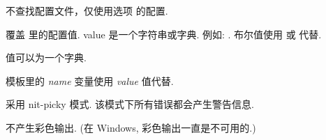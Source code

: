 \documentclass[letterpaper,10pt,english]{sphinxmanual}
\begin{document}

\begin{fulllineitems}
\label{invocation:cmdoption-sphinx-build-C}
不查找配置文件，仅使用选项  的配置.


\end{fulllineitems}


\begin{fulllineitems}
\label{invocation:cmdoption-sphinx-build-D}
覆盖  里的配置值.  value 是一个字符串或字典.
例如: .
布尔值使用  或  代替.

值可以为一个字典.

\end{fulllineitems}


\begin{fulllineitems}
\label{invocation:cmdoption-sphinx-build-A}
模板里的 \emph{name} 变量使用 \emph{value} 值代替.


\end{fulllineitems}


\begin{fulllineitems}
\label{invocation:cmdoption-sphinx-build-n}
采用 nit-picky 模式.  该模式下所有错误都会产生警告信息.

\end{fulllineitems}


\begin{fulllineitems}
\label{invocation:cmdoption-sphinx-build-N}
不产生彩色输出.  (在 Windows, 彩色输出一直是不可用的.)

\end{fulllineitems}
\end{document}
